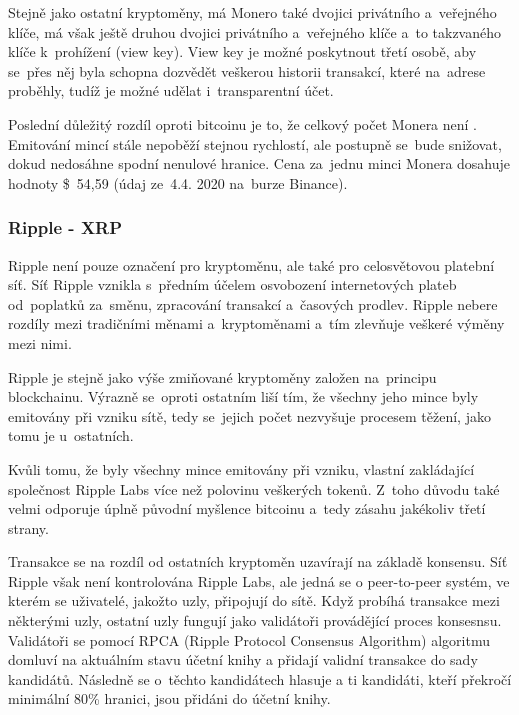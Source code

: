 \documentclass[thesis=B,czech]{FITthesis}[2019/03/21]
\begin{document}
Stejně jako ostatní kryptoměny, má Monero také dvojici privátního \linebreak a~veřejného klíče, má však ještě druhou dvojici privátního a~veřejného klíče a~to takzvaného klíče k~prohížení (view key). View key je možné poskytnout třetí osobě, aby se~přes něj byla schopna dozvědět veškerou historii transakcí, které na~adrese proběhly, tudíž je možné udělat i~transparentní účet.

Poslední důležitý rozdíl oproti bitcoinu je to, že celkový počet Monera není . Emitování mincí stále nepoběží stejnou rychlostí, ale postupně se~bude snižovat, dokud nedosáhne spodní nenulové hranice. \cite{alza_monero} Cena za~jednu minci Monera dosahuje hodnoty  \$~54,59 (údaj ze~4.4. 2020 na~burze Binance). \cite{binance_markets}

\subsubsection{Ripple - XRP}
Ripple není pouze označení pro kryptoměnu, ale také pro celosvětovou platební síť. Síť Ripple vznikla s~předním účelem osvobození internetových plateb od~poplatků za~směnu, zpracování transakcí a~časových prodlev. Ripple nebere rozdíly mezi tradičními měnami a~kryptoměnami a~tím zlevňuje veškeré výměny mezi nimi.

Ripple je stejně jako výše zmiňované kryptoměny založen na~principu blockchainu. Výrazně se~oproti ostatním liší tím, že všechny jeho mince byly emitovány při vzniku sítě, tedy se~jejich počet nezvyšuje procesem těžení, jako tomu je u~ostatních.

Kvůli tomu, že byly všechny mince emitovány při vzniku, vlastní zakládající společnost Ripple Labs více než polovinu veškerých tokenů. Z~toho důvodu také velmi odporuje úplně původní myšlence bitcoinu a~tedy zásahu jakékoliv třetí strany. \cite{alza_ripple}

Transakce se na rozdíl od ostatních kryptoměn uzavírají na základě konsensu. Síť Ripple však není kontrolována Ripple Labs, ale jedná se o peer-to-peer systém, ve kterém se uživatelé, jakožto uzly, připojují do sítě. Když probíhá transakce mezi některými uzly, ostatní uzly fungují jako validátoři provádějící proces konsesnsu. Validátoři se pomocí RPCA (Ripple Protocol Consensus Algorithm) algoritmu domluví na aktuálním stavu účetní knihy a přidají validní transakce do sady kandidátů. Následně se o~těchto kandidátech hlasuje a ti kandidáti, kteří překročí minimální 80\% hranici, jsou přidáni do účetní knihy. \cite{RPCA}
\end{document}
